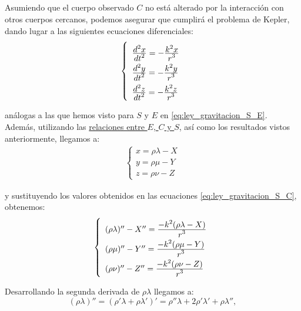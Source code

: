 \documentclass[11pt]{article}
\newcommand\ddfrac[2]{\frac{\displaystyle #1}{\displaystyle #2}}
\begin{document}
\subsection{}
\label{subsec:ley_gravitacion}
Asumiendo que el cuerpo observado $C$ no está alterado por la interacción con otros cuerpos cercanos, podemos asegurar que cumplirá el problema de Kepler, dando lugar a las siguientes ecuaciones diferenciales:
\begin{align}
\left\{
\def\arraystretch{2}
\begin{array}{l}
	\ddfrac{d^2x}{dt^2}=-\ddfrac{k^2x}{r^3}\\
	\ddfrac{d^2y}{dt^2}=-\ddfrac{k^2y}{r^3}\\
	\ddfrac{d^2z}{dt^2}=-\ddfrac{k^2z}{r^3}
\end{array}
\right.
\label{eq:ley_gravitacion_S_C}
\end{align}

\noindent análogas a las que hemos visto para $S$ y $E$ en \eqref{eq:ley_gravitacion_S_E}.\\

Además, utilizando las \hyperref[eq:terminologia]{relaciones entre $E$, $C$ y $S$}, así como los resultados vistos anteriormente, llegamos a:
\begin{align}
\left\{
\begin{array}{l}
	x=\rho\lambda-X\\
	y=\rho\mu-Y\\
	z=\rho\nu-Z
\end{array}
\right.
\label{eq:relacion_C_S_E}
\end{align}

\noindent y sustituyendo los valores obtenidos en las  ecuaciones \eqref{eq:ley_gravitacion_S_C}, obtenemos:
\begin{align}
\left\{
\def\arraystretch{2}
\begin{array}{l}
	(\rho\lambda)'' - X'' = \ddfrac{-k^2(\rho\lambda-X)}{r^3}\\
	(\rho\mu)'' - Y'' = \ddfrac{-k^2(\rho\mu-Y)}{r^3}\\
	(\rho\nu)'' - Z'' = \ddfrac{-k^2(\rho\nu-Z)}{r^3}
\end{array}
\right.
\label{eq:derivada_segunda}
\end{align}

Desarrollando la segunda derivada de $\rho\lambda$ llegamos a:
\[
(\rho\lambda)''=(\rho'\lambda+\rho\lambda')'=\rho''\lambda+2\rho'\lambda'+\rho\lambda'',
\]
\end{document}
